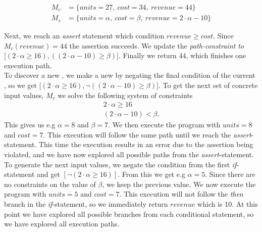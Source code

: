 \begin{align*}
	M_c & = \{units = 27, \ cost = 34, \ revenue = 44 \}\\
	M_s & = \{ units = \alpha, \ cost = \beta, \ revenue = 2 \cdot \alpha - 10 \}
\end{align*}

Next, we reach an \textsl{assert} statement which condition $revenue \geq cost$. Since $M_c(revenue) = 44$ the assertion succeeds. We update the \emph{path-constraint to} $\lbrack (2\cdot \alpha \geq 16) , ((2\cdot \alpha - 10) \geq \beta) \rbrack$. Finally we return 44, which finishes one execution path.\\
To discover a new \pc, we make a new \pc by negating the final condition of the current \pc, so we get $\lbrack (2\cdot \alpha \geq 16), \neg ((2\cdot \alpha - 10) \geq \beta) \rbrack$. To get the next set of concrete input values, $M_c$ we solve the following system of constraints
\begin{align*}
	2\cdot \alpha \geq 16\\
	(2\cdot \alpha - 10) < \beta.
\end{align*}
This gives us e.g $\alpha = 8$ and $\beta = 7$. 
We then execute the program with $units = 8$ and $cost = 7$. This execution will follow the same path until we reach the \textsl{assert}-statement. This time the execution results in an error due to the assertion being violated, and we have now explored all possible paths from the \textsl{assert}-statement. To generate the next input values, we negate the condition from the first \textsl{if}-statement and get $[\neg (2\cdot \alpha \geq 16)]$. From this we get e.g $\alpha = 5$. Since there are no constraints on the value of $\beta$, we keep the previous value.  We now execute the program with $units = 5$ and $cost = 7$. This execution will not follow the \textsl{then} branch in the \textsl{if}-statement, so we immediately return $revenue$ which is 10. At this point we have explored all possible branches from each conditional statement, so we have explored all execution paths. 

